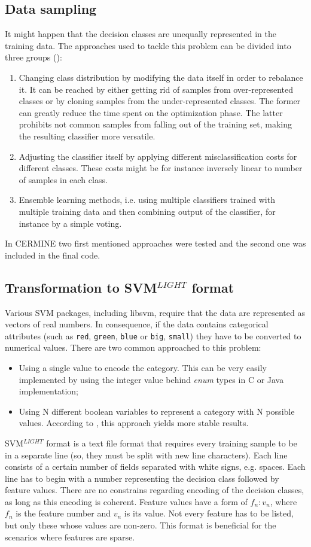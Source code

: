 \subsection{Data sampling}
It might happen that the decision classes are unequally represented in the training data. The approaches used to tackle this problem can be divided into three groups (\cite{Choi}):
\begin{enumerate}
\item Changing class distribution by modifying the data itself in order to rebalance it. It can be reached by either getting rid of samples from over-represented classes or by cloning samples from the under-represented classes. The former can greatly reduce the time spent on the optimization phase. The latter prohibits not common samples from falling out of the training set, making the resulting classifier more versatile.
\item Adjusting the classifier itself by applying different misclassification costs for different classes. These costs might be for instance inversely linear to number of samples in each class.
\item Ensemble learning methods, i.e. using multiple classifiers trained with multiple training data and then combining output of the classifier, for instance by a simple voting.
\end{enumerate}
In CERMINE two first mentioned approaches were tested and the second one was included in the final code.
\\
\subsection{Transformation to SVM$^{LIGHT}$ format}
Various SVM packages, including libsvm, require that the data are represented as vectors of real numbers. In consequence, if the data contains categorical attributes (such as \verb+red+, \verb+green+, \verb+blue+ or \verb+big+, \verb+small+) they have to be converted to numerical values. There are two common approached to this problem:
\begin{itemize}
\item Using a single value to encode the category. This can be very easily implemented by using the integer value behind \textit{enum} types in C or Java implementation;
\item Using N different boolean variables to represent a category with N possible values. According to \cite{Chih-WeiHsu2010}, this approach yields more stable results.
\end{itemize}
\qquad
SVM$^{LIGHT}$ format is a text file format that requires every training sample to be in a separate line (so, they must be split with new line characters). Each line consists of a certain number of fields separated with white signs, e.g. spaces. Each line has to begin with a number representing the decision class followed by feature values. There are no constrains regarding encoding of the decision classes, as long as this encoding is coherent. Feature values have a form of $f_n:v_n$, where $f_n$ is the feature number and $v_n$ is its value. Not every feature has to be listed, but only these whose values are non-zero. This format is beneficial for the scenarios where features are sparse.

